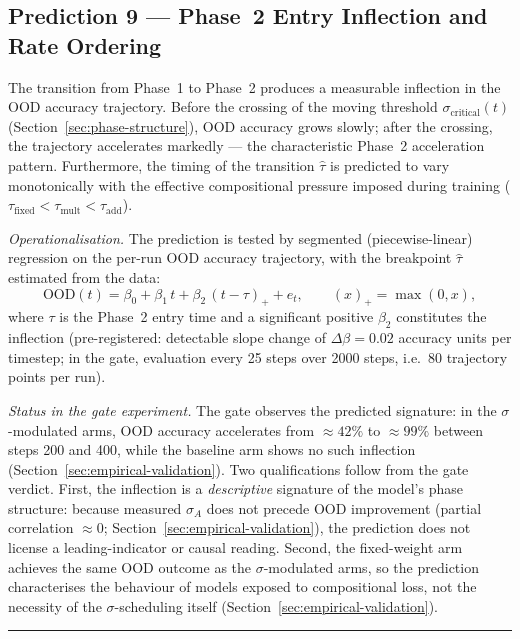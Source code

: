 \documentclass{article}
\theoremstyle{definition}
\begin{document}
\subsection{Prediction 9 --- Phase~2 Entry Inflection and Rate Ordering}

The transition from Phase~1 to Phase~2 produces a measurable inflection
in the OOD accuracy trajectory. Before the crossing of the moving
threshold $\sigma_{\text{critical}}(t)$
(Section~\ref{sec:phase-structure}), OOD accuracy grows slowly; after
the crossing, the trajectory accelerates markedly --- the
characteristic Phase~2 acceleration pattern. Furthermore, the timing of the transition $\hat{\tau}$ is predicted to vary monotonically with the effective compositional pressure imposed during training ($\tau_{\text{fixed}} < \tau_{\text{mult}} < \tau_{\text{add}}$).

\noindent\emph{Operationalisation.} The prediction is tested by
segmented (piecewise-linear) regression on the per-run OOD accuracy
trajectory, with the breakpoint $\hat{\tau}$ estimated from the data:
\[
\text{OOD}(t) = \beta_0 + \beta_1\, t + \beta_2\, (t - \tau)_+ + e_t,
\qquad (x)_+ = \max(0, x),
\]
where $\tau$ is the Phase~2 entry time and a significant positive
$\beta_2$ constitutes the inflection (pre-registered: detectable slope
change of $\Delta\beta = 0.02$ accuracy units per timestep; in the gate,
evaluation every 25 steps over 2000 steps, i.e.\ 80 trajectory points
per run).

\noindent\emph{Status in the gate experiment.} The gate observes the
predicted signature: in the $\sigma$-modulated arms, OOD accuracy
accelerates from $\approx 42\%$ to $\approx 99\%$ between steps 200 and
400, while the baseline arm shows no such inflection
(Section~\ref{sec:empirical-validation}). Two qualifications follow
from the gate verdict. First, the inflection is a \emph{descriptive}
signature of the model's phase structure: because measured $\sigma_A$
does not precede OOD improvement (partial correlation $\approx 0$;
Section~\ref{sec:empirical-validation}), the prediction does not license
a leading-indicator or causal reading. Second, the fixed-weight arm
achieves the same OOD outcome as the $\sigma$-modulated arms, so the
prediction characterises the behaviour of models exposed to
compositional loss, not the necessity of the $\sigma$-scheduling itself
(Section~\ref{sec:empirical-validation}).

\noindent\rule{\linewidth}{0.4pt}

\end{document}
